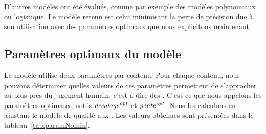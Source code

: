D'autres modèles ont été évalués, comme par exemple des modèles polynomiaux ou logistique. Le modèle retenu est celui minimisant la perte de précision due à son utilisation avec des paramètres optimaux que nous explicitons maintenant.


\subsection{Paramètres optimaux du modèle}
Le modèle utilise deux paramètres par contenu. Pour chaque contenu, nous pouvons déterminer quelles valeurs de ces paramètres permettent de s'approcher au plus près du jugement humain, c'est-à-dire des \Dcent.  C'est ce que nous appelons les paramètres optimaux, notés $\mathit{decalage}^{\textit{opt}}$ et $\mathit{pente}^{\textit{opt}}$. Nous les calculons en ajustant le modèle de qualité aux \Dcent. Les valeurs obtenues sont présentées dans le tableau~\ref{tab:paramNomin}.


